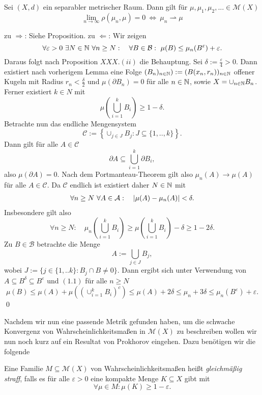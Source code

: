 \begin{theorem}
    Sei $(X,d)$ ein separabler metrischer Raum. Dann gilt für $\mu, \mu_1, \mu_2, ... \in \mathcal{M}(X)$
    $$
        \lim_{n \to \infty} \rho(\mu_n, \mu) = 0 \ \iff \ \mu_n \rightharpoonup \mu 
    $$
\end{theorem}

\begin{proof*}
    zu $\Rightarrow$: Siehe Proposition.
    \newline 
    zu $\Leftarrow$:  Wir zeigen
    $$
        \forall \varepsilon > 0 \ \exists N \in \N \ \forall n \geq N: \quad \forall B \in \mathcal{B}: \  \mu(B) \leq \mu_n(B^{\varepsilon}) + \varepsilon. 
    $$
    Daraus folgt nach Proposition $XXX.(ii)$ die Behauptung. Sei $\delta := \frac{\varepsilon}{4} > 0$. 
    Dann existiert nach vorherigem Lemma eine Folge $(B_n)_{n \in \mathbb{N}}) := (B(x_n, r_n))_{n \in \mathbb{N}}$ offener Kugeln mit Radius $r_n < \frac{\delta}{2}$  
    und $\mu(\partial B_n) = 0$ für alle $n \in \mathbb{N}$, sowie $X = \cup_{n \in  \mathbb{N}}B_n$. Ferner existiert $k \in N$ mit
    $$
        \mu\left(\bigcup_{i=1}^k B_i\right) \geq 1 - \delta. 
    $$
    Betrachte nun das endliche Mengensystem 
    $$
        \mathcal{C} := \left\{ \cup_{j \in J}B_j : J \subseteq \{1,..,k\}\right\}. 
    $$
    Dann gilt für alle $A \in \mathcal{C}$
    $$
        \partial A \subseteq \bigcup_{i=1}^k \partial B_i,
    $$
    also $\mu(\partial A) = 0$. Nach dem Portmanteau-Theorem gilt also $\mu_n(A) \to \mu(A)$ für alle $A \in \mathcal{C}$. Da $\mathcal{C}$ endlich ist existiert daher $N \in \mathbb{N}$ mit
    \begin{align}
        \forall n \geq N \ \forall A \in \mathcal{A}: \quad \left| \mu(A) - \mu_n(A) \right| < \delta. 
    \end{align}
    Insbesondere gilt also
    $$
        \forall n \geq N: \quad \mu_n\left(\bigcup_{i=1}^k B_i\right) \geq \mu\left(\bigcup_{i=1}^k B_i\right) - \delta \geq 1 - 2\delta. 
    $$
    Zu $B \in \mathcal{B}$ betrachte die Menge 
    $$
        A := \bigcup_{j \in J} B_j,
    $$
    wobei $J := \{j \in \{1,..k\}: B_j \cap B \neq 0 \}$. Dann ergibt sich unter Verwendung von $A \subseteq B^{\delta} \subseteq B^{\varepsilon}$ und $(1.1)$ für alle $n \geq N$ 
    $$
        \mu(B) \leq \mu(A) + \mu\left((\cup_{i=1}^k B_i)^c\right) \leq \mu(A) + 2\delta \leq \mu_n + 3\delta \leq \mu_n(B^{\varepsilon}) + \varepsilon. 
    $$
    \qed
    
\end{proof*}
Nachdem wir nun eine passende Metrik gefunden haben, um die schwache Konvergenz von Wahrscheinlichkeitsmaßen in $\mathcal{M}(X)$ zu beschreiben wollen wir nun noch kurz auf ein Resultat von Prokhorov eingehen. 
Dazu benötigen wir die folgende 
\begin{mydef}
    Eine Familie $M \subseteq \mathcal{M}(X)$ von Wahrscheinlichkeitsmaßen heißt \textit{gleichmäßig straff}, 
    falls es für alle $\varepsilon > 0$ eine kompakte Menge $K \subseteq X$ gibt mit 
    $$
        \forall \mu \in M: \mu(K) \geq 1-\varepsilon. 
    $$
\end{mydef}

